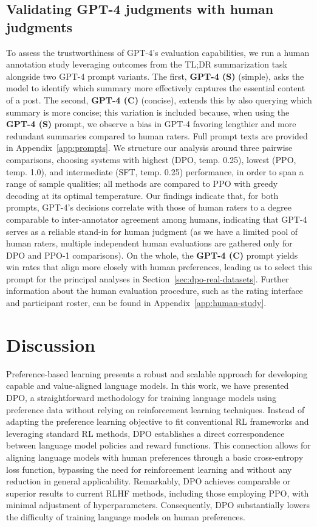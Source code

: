 \subsection{Validating GPT-4 judgments with human judgments}
\label{sec:human-judgments}
To assess the trustworthiness of GPT-4's evaluation capabilities, we run a human annotation study leveraging outcomes from the TL;DR summarization task alongside two GPT-4 prompt variants. The first, \textbf{GPT-4 (S)} (simple), asks the model to identify which summary more effectively captures the essential content of a post. The second, \textbf{GPT-4 (C)} (concise), extends this by also querying which summary is more concise; this variation is included because, when using the \textbf{GPT-4 (S)} prompt, we observe a bias in GPT-4 favoring lengthier and more redundant summaries compared to human raters. Full prompt texts are provided in Appendix~\ref{app:prompts}. We structure our analysis around three pairwise comparisons, choosing systems with highest (DPO, temp. 0.25), lowest (PPO, temp. 1.0), and intermediate (SFT, temp. 0.25) performance, in order to span a range of sample qualities; all methods are compared to PPO with greedy decoding at its optimal temperature. Our findings indicate that, for both prompts, GPT-4's decisions correlate with those of human raters to a degree comparable to inter-annotator agreement among humans, indicating that GPT-4 serves as a reliable stand-in for human judgment (as we have a limited pool of human raters, multiple independent human evaluations are gathered only for DPO and PPO-1 comparisons). On the whole, the \textbf{GPT-4 (C)} prompt yields win rates that align more closely with human preferences, leading us to select this prompt for the principal analyses in Section~\ref{sec:dpo-real-datasets}. Further information about the human evaluation procedure, such as the rating interface and participant roster, can be found in Appendix~\ref{app:human-study}.

\section{Discussion}
Preference-based learning presents a robust and scalable approach for developing capable and value-aligned language models. In this work, we have presented DPO, a straightforward methodology for training language models using preference data without relying on reinforcement learning techniques. Instead of adapting the preference learning objective to fit conventional RL frameworks and leveraging standard RL methods, DPO establishes a direct correspondence between language model policies and reward functions. This connection allows for aligning language models with human preferences through a basic cross-entropy loss function, bypassing the need for reinforcement learning and without any reduction in general applicability. Remarkably, DPO achieves comparable or superior results to current RLHF methods, including those employing PPO, with minimal adjustment of hyperparameters. Consequently, DPO substantially lowers the difficulty of training language models on human preferences.

